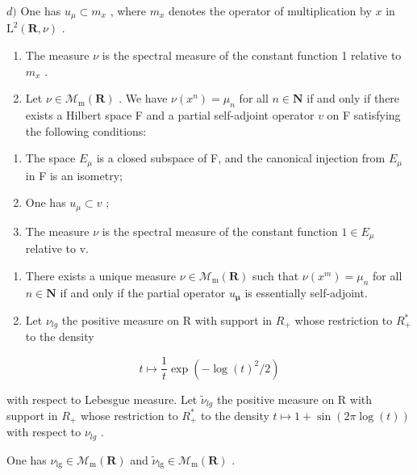 \(d)\) One has \(u_{\mu} \subset m_x\) , where \(m_x\) denotes the operator of multiplication by \(x\) in \(\mathrm{L}^2(\mathbf{R}, \nu)\) .

\begin{enumerate}
\def\labelenumi{\alph{enumi})}
\setcounter{enumi}{4}
\item
  The measure \(\nu\) is the spectral measure of the constant function 1 relative to \(m_x\) .
\item
  Let \(\nu \in \mathcal{M}_{\mathrm{m}}(\mathbf{R})\) . We have \(\nu(x^n) = \mu_n\) for all \(n \in \mathbf{N}\) if and only if there exists a Hilbert space F and a partial self-adjoint operator \(v\) on F satisfying the following conditions:
\end{enumerate}

\begin{enumerate}
\def\labelenumi{(\roman{enumi})}
\item
  The space \(E_{\mu}\) is a closed subspace of F, and the canonical injection from \(E_{\mu}\) in F is an isometry;
\item
  One has \(u_{\mu} \subset v\) ;
\item
  The measure \(\nu\) is the spectral measure of the constant function \(1 \in E_{\mu}\) relative to v.
\end{enumerate}

\begin{enumerate}
\def\labelenumi{\alph{enumi})}
\setcounter{enumi}{6}
\item
  There exists a unique measure \(\nu \in \mathcal{M}_{\mathrm{m}}(\mathbf{R})\) such that \(\nu(x^{m}) = \mu_{n}\) for all \(n \in \mathbf{N}\) if and only if the partial operator \(u_{\boldsymbol{\mu}}\) is essentially self-adjoint.
\item
  Let \(\nu_{lg}\) the positive measure on R with support in \(R_{+}\) whose restriction to \(R_{+}^{*}\) to the density
\end{enumerate}

\[
t \mapsto \frac {1}{t} \exp (- \log (t) ^ {2} / 2)
\]

with respect to Lebesgue measure. Let \(\widetilde{\nu}_{lg}\) the positive measure on R with support in \(R_{+}\) whose restriction to \(R_{+}^{*}\) to the density \(t \mapsto 1 + \sin(2\pi \log(t))\) with respect to \(\nu_{lg}\) .

One has \(\nu_{\mathrm{lg}} \in \mathcal{M}_{\mathrm{m}}(\mathbf{R})\) and \(\widetilde{\nu}_{\mathrm{lg}} \in \mathcal{M}_{\mathrm{m}}(\mathbf{R})\) .

